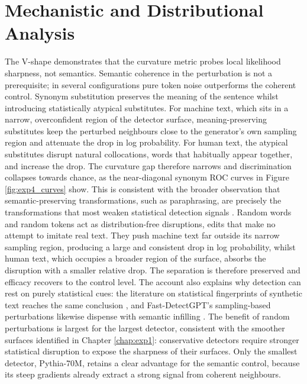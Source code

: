 \documentclass[logo,msc,cs]{infthesis}      %
\begin{document}
\section{Mechanistic and Distributional Analysis}
\label{sec:exp4_analysis}
The V-shape demonstrates that the curvature metric probes local likelihood sharpness, not semantics. Semantic coherence in the perturbation is not a prerequisite; in several configurations pure token noise outperforms the coherent control.
Synonym substitution preserves the meaning of the sentence whilst introducing statistically atypical substitutes. For machine text, which sits in a narrow, overconfident region of the detector surface, meaning-preserving substitutes keep the perturbed neighbours close to the generator's own sampling region and attenuate the drop in log probability. For human text, the atypical substitutes disrupt natural collocations, words that habitually appear together, and increase the drop. The curvature gap therefore narrows and discrimination collapses towards chance, as the near-diagonal synonym ROC curves in Figure \ref{fig:exp4_curves} show. This is consistent with the broader observation that semantic-preserving transformations, such as paraphrasing, are precisely the transformations that most weaken statistical detection signals \citep{sadasivan2023can}.
Random words and random tokens act as distribution-free disruptions, edits that make no attempt to imitate real text. They push machine text far outside its narrow sampling region, producing a large and consistent drop in log probability, whilst human text, which occupies a broader region of the surface, absorbs the disruption with a smaller relative drop. The separation is therefore preserved and efficacy recovers to the control level. The account also explains why detection can rest on purely statistical cues: the literature on statistical fingerprints of synthetic text reaches the same conclusion \citep{uchendu2021turingbench}, and Fast-DetectGPT's sampling-based perturbations likewise dispense with semantic infilling \citep{bao2024fast}.
The benefit of random perturbations is largest for the largest detector, consistent with the smoother surfaces identified in Chapter \ref{chap:exp1}: conservative detectors require stronger statistical disruption to expose the sharpness of their surfaces. Only the smallest detector, Pythia-70M, retains a clear advantage for the semantic control, because its steep gradients already extract a strong signal from coherent neighbours.

\newpage
\end{document}
